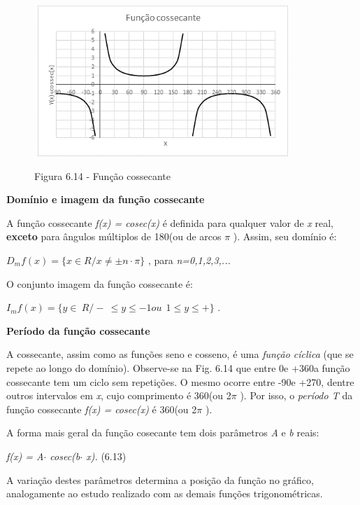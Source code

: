 \begin{figure}[H]
    \begin{Center}
        \includegraphics[width=3.83in,height=2.24in]{capitulos/trigonometria_e_funcoes_trigonometricas/media/image43.png}

        Figura 6.14  - Função cossecante
    \end{Center}
\end{figure}

\textbf{Domínio e imagem da função cossecante}

A função cossecante \textit{f(x) = cosec(x) }é definida para qualquer valor de \textit{x} real, \textbf{exceto} para ângulos múltiplos de 180\degree  (ou de arcos \textit{$ \pi $ }). Assim, seu domínio é:

  \( D_{m}f \left( x \right) = \{ x \in  R / x \neq  \pm n \cdot  \pi  \}  \) , para \textit{n=0,1,2,3,...}

O conjunto imagem da função cossecante é:

  \( I_{m}f \left( x \right) = \{ y \in ~R /  - ~ \leq  y  \leq  -1  ou~~ 1  \leq  y  \leq  + \}  \) .

\textbf{Período da função cossecante}

A cossecante, assim como as funções seno e cosseno, é uma \textit{função cíclica} (que se repete ao longo do domínio). Observe-se na Fig. 6.14 que entre 0\degree  e +360\degree a função cossecante tem um ciclo sem repetições. O mesmo ocorre entre -90\degree e +270\degree, dentre outros intervalos em \textit{x}, cujo comprimento é 360\degree (ou 2$ \pi $ ). Por isso, o \textit{período T} da função cossecante  \textit{f(x) = cosec(x) } é 360\degree (ou  2$ \pi $ ).

A forma mais geral da função cosecante tem dois parâmetros \textit{A }e\textit{ b} reais:

\textit{f(x) = A$ \cdot $ cosec(b$ \cdot $ x).  \tab \tab \tab \tab \tab   }(6.13)

A variação destes parâmetros determina a posição da função no gráfico, analogamente ao estudo realizado com as demais funções trigonométricas.

